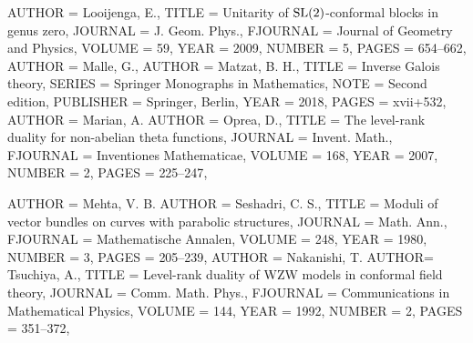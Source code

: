 \begin{bibdiv}
\begin{biblist}
 {
    AUTHOR = {Looijenga, E.},
     TITLE = {Unitarity of {${\rm SL}(2)$}-conformal blocks in genus zero},
   JOURNAL = {J. Geom. Phys.},
  FJOURNAL = {Journal of Geometry and Physics},
    VOLUME = {59},
      YEAR = {2009},
    NUMBER = {5},
     PAGES = {654--662},
}
 {
    AUTHOR = {Malle, G.},
    AUTHOR = {Matzat, B. H.},
     TITLE = {Inverse {G}alois theory},
    SERIES = {Springer Monographs in Mathematics},
      NOTE = {Second edition},
 PUBLISHER = {Springer, Berlin},
      YEAR = {2018},
     PAGES = {xvii+532},
}
 {
    AUTHOR = {Marian, A.}
    AUTHOR = {Oprea, D.},
     TITLE = {The level-rank duality for non-abelian theta functions},
   JOURNAL = {Invent. Math.},
  FJOURNAL = {Inventiones Mathematicae},
    VOLUME = {168},
      YEAR = {2007},
    NUMBER = {2},
     PAGES = {225--247},
}




 {
    AUTHOR = {Mehta, V. B.}
    AUTHOR = {Seshadri, C. S.},
     TITLE = {Moduli of vector bundles on curves with parabolic structures},
   JOURNAL = {Math. Ann.},
  FJOURNAL = {Mathematische Annalen},
    VOLUME = {248},
      YEAR = {1980},
    NUMBER = {3},
     PAGES = {205--239},
}
 {
    AUTHOR = {Nakanishi, T.}
    AUTHOR=  {Tsuchiya, A.},
     TITLE = {Level-rank duality of {WZW} models in conformal field theory},
   JOURNAL = {Comm. Math. Phys.},
  FJOURNAL = {Communications in Mathematical Physics},
    VOLUME = {144},
      YEAR = {1992},
    NUMBER = {2},
     PAGES = {351--372},
}


\end{biblist}
\end{bibdiv}
